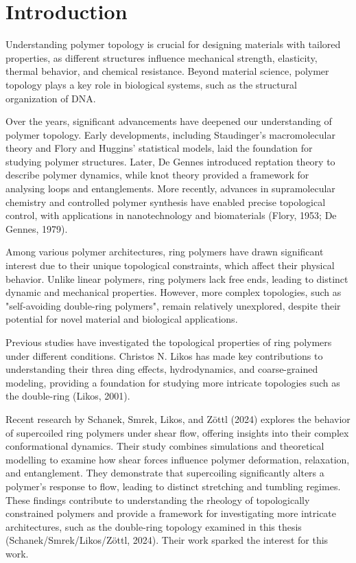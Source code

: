 \documentclass{article}      %
\begin{document}
\section{Introduction}

Understanding polymer topology is crucial for designing materials with tailored properties, as different structures influence mechanical strength, elasticity, thermal behavior, and chemical resistance. Beyond material science, polymer topology plays a key role in biological systems, such as the structural organization of DNA.

Over the years, significant advancements have deepened our understanding of polymer topology. Early developments, including Staudinger’s macromolecular theory and Flory and Huggins’ statistical models, laid the foundation for studying polymer structures. Later, De Gennes introduced reptation theory to describe polymer dynamics, while knot theory provided a framework for analysing loops and entanglements. More recently, advances in supramolecular chemistry and controlled polymer synthesis have enabled precise topological control, with applications in nanotechnology and biomaterials (Flory, 1953; De Gennes, 1979).

Among various polymer architectures, ring polymers have drawn significant interest due to their unique topological constraints, which affect their physical behavior. Unlike linear polymers, ring polymers lack free ends, leading to distinct dynamic and mechanical properties. However, more complex topologies, such as "self-avoiding double-ring polymers", remain relatively unexplored, despite their potential for novel material and biological applications.

Previous studies have investigated the topological properties of ring polymers under different conditions. Christos N. Likos has made key contributions to understanding their threa    ding effects, hydrodynamics, and coarse-grained modeling, providing a foundation for studying more intricate topologies such as the double-ring (Likos, 2001).

Recent research by Schanek, Smrek, Likos, and Zöttl (2024) explores the behavior of supercoiled ring polymers under shear flow, offering insights into their complex conformational dynamics. Their study combines simulations and theoretical modelling to examine how shear forces influence polymer deformation, relaxation, and entanglement. They demonstrate that supercoiling significantly alters a polymer’s response to flow, leading to distinct stretching and tumbling regimes. These findings contribute to understanding the rheology of topologically constrained polymers and provide a framework for investigating more intricate architectures, such as the double-ring topology examined in this thesis (Schanek/Smrek/Likos/Zöttl, 2024). Their work sparked the interest for this work. 
\end{document}
